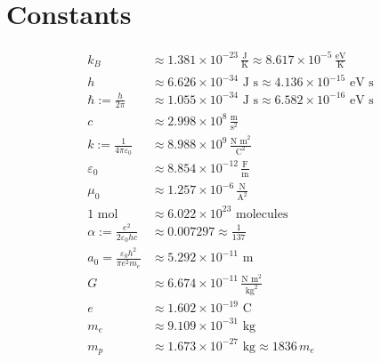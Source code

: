 \documentclass[12pt]{article}
\begin{document}
\section{Constants}
\begin{align*}
    k_B &\approx 1.381 \times 10^{-23} \, \frac{\text{J}}{\text{K}} \approx 8.617 \times 10^{-5} \, \frac{\text{eV}}{\text{K}} \\
    h &\approx 6.626 \times 10^{-34} \text{ J s} \approx 4.136 \times 10^{-15} \text{ eV s} \\
\hbar := \frac{h}{2 \pi} &\approx 1.055 \times 10^{-34} \text{ J s} \approx 6.582 \times 10^{-16} \text{ eV s} \\
    c &\approx 2.998 \times 10^8 \, \frac{\text{m}}{\text{s}^2} \\
    k := \frac{1}{4 \pi \varepsilon_0} &\approx 8.988 \times 10^9 \, \frac{\text{N m}^2}{\text{C}^2} \\
    \varepsilon_0 &\approx 8.854 \times 10^{-12} \, \frac{\text{F}}{\text{m}} \\
    \mu_0 &\approx 1.257 \times 10^{-6} \, \frac{\text{N}}{\text{A}^2} \\
    1 \text{ mol} &\approx 6.022 \times 10^{23} \text{ molecules} \\
    \alpha := \frac{e^2}{2 \varepsilon_0 h c} &\approx 0.007297 \approx \frac{1}{137} \\
    a_0 = \frac{\varepsilon_0 h^2}{\pi e^2 m_e} &\approx 5.292 \times 10^{-11} \text{ m} \\
    G &\approx 6.674 \times 10^{-11} \, \frac{\text{N m}^2}{\text{kg}^2} \\
    e &\approx 1.602 \times 10^{-19} \text{ C} \\
    m_e &\approx 9.109 \times 10^{-31} \text{ kg} \\
    m_p &\approx 1.673 \times 10^{-27} \text{ kg} \approx 1836 \, m_e
\end{align*}
\end{document}
